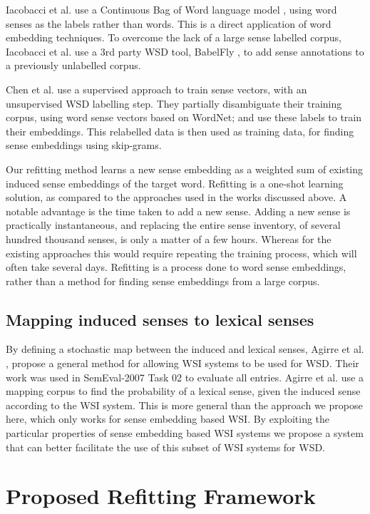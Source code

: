 {Iacobacci et al. \parencite{iacobacci2015sensembed} use a Continuous Bag of Word language model \parencite{mikolov2013efficient}, using word senses as the labels rather than words.
This is a direct application of word embedding techniques.
To overcome the lack of a large sense labelled corpus, Iacobacci et al. use a 3rd party WSD tool, BabelFly \parencite{Moro2014}, to add sense annotations to a previously unlabelled corpus. 

Chen et al. \parencite{Chen2014} use a supervised approach to train sense vectors, with an unsupervised WSD labelling step.
They partially disambiguate their training corpus, using  word sense vectors based on WordNet; and use these labels to train their embeddings.
This relabelled data is then used as training data, for finding sense embeddings using skip-grams.

Our refitting method learns a new sense embedding as a weighted sum of existing induced sense embeddings of the target word.
Refitting is a one-shot learning solution, as compared to the approaches used in the works discussed above.
A notable advantage is the time taken to add a new sense.
Adding a new sense is practically instantaneous, and replacing the entire sense inventory, of several hundred thousand senses, is only a matter of a few hours.
Whereas for the existing approaches this would require repeating the training process, which will often take several days.
Refitting is a process done to word sense embeddings, rather than a method for finding sense embeddings from a large corpus. 

\subsection{Mapping induced senses to lexical senses}\label{mapping}
By defining a stochastic map between the induced and lexical senses, Agirre et al. \parencite{agirre2006}, propose a general method for allowing WSI systems to be used for WSD.
Their work was used in SemEval-2007 Task 02 \parencite{SemEval2007WSIandWSD} to evaluate all entries. 
Agirre et al. use a mapping corpus to find the probability of a lexical sense, given the induced sense according to the WSI system.
This is more general than the approach we propose here, which only works for sense embedding based WSI.
By exploiting the particular properties of sense embedding based WSI systems we propose a system that can better facilitate the use of this subset of WSI systems for WSD.

\section{Proposed Refitting Framework} \label{refitting} \label{Framework}

}
